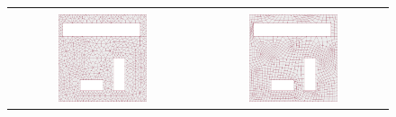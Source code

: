 \documentclass[a4paper,10pt]{report}
\begin{document}
\begin{figure}
\begin{tabular}{cc}
\\
\\
\includegraphics[width = 0.49\textwidth]{holes0}&
\includegraphics[width = 0.49\textwidth]{holes1}
\end{tabular}
\end{figure}
\end{document}
